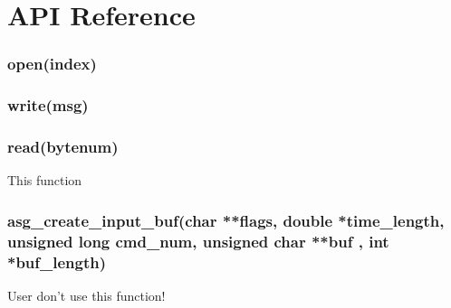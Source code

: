 \chapter{API Reference}

%


\subsection{open(index)}
\subsection{write(msg)}
\subsection{read(bytenum)}
This function  
\subsection{asg\_create\_input\_buf(char **flags, double *time\_length, unsigned long cmd\_num,
 \newline unsigned char **buf , int *buf\_length)}
User don't use this function!

